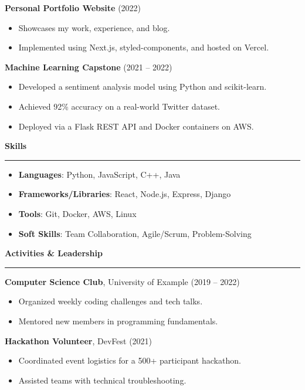 \documentclass[letterpaper,10pt]{article}
\newcommand{\resheading}[1]{
  \vspace{10pt}
  \textbf{\large #1}
  \vspace{5pt}
  \hrule
  \vspace{5pt}
}
\begin{document}
\textbf{Personal Portfolio Website} \hfill (2022)
\begin{itemize}
    \item Showcases my work, experience, and blog.
    \item Implemented using Next.js, styled-components, and hosted on Vercel.
\end{itemize}

\textbf{Machine Learning Capstone} \hfill (2021 -- 2022)
\begin{itemize}
    \item Developed a sentiment analysis model using Python and scikit-learn.
    \item Achieved 92\% accuracy on a real-world Twitter dataset.
    \item Deployed via a Flask REST API and Docker containers on AWS.
\end{itemize}

\resheading{Skills}

\begin{itemize}
    \item \textbf{Languages}: Python, JavaScript, C++, Java
    \item \textbf{Frameworks/Libraries}: React, Node.js, Express, Django
    \item \textbf{Tools}: Git, Docker, AWS, Linux
    \item \textbf{Soft Skills}: Team Collaboration, Agile/Scrum, Problem-Solving
\end{itemize}

\resheading{Activities \& Leadership}

\textbf{Computer Science Club}, University of Example (2019 -- 2022)
\begin{itemize}
    \item Organized weekly coding challenges and tech talks.
    \item Mentored new members in programming fundamentals.
\end{itemize}

\textbf{Hackathon Volunteer}, DevFest (2021)
\begin{itemize}
    \item Coordinated event logistics for a 500+ participant hackathon.
    \item Assisted teams with technical troubleshooting.
\end{itemize}

\end{document}
